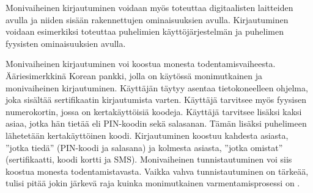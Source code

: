 Monivaiheinen kirjautuminen voidaan myös toteuttaa digitaalisten laitteiden avulla ja niiden sisään rakennettujen ominaisuuksien avulla. Kirjautuminen voidaan esimerkiksi toteuttaa puhelimien käyttöjärjestelmän ja puhelimen fyysisten ominaisuuksien avulla. 

Monivaiheinen kirjautuminen voi koostua monesta todentamisvaiheesta. Ääriesimerkkinä Korean pankki, jolla on käytössä monimutkainen ja monivaiheinen kirjautuminen. Käyttäjän täytyy asentaa tietokoneelleen ohjelma, joka sisältää sertifikaatin kirjautumista varten. Käyttäjä tarvitsee myös fyysisen numerokortin, jossa on kertakäyttöisiä koodeja. Käyttäjä tarvitsee lisäksi kaksi asiaa, jotka hän tietää eli PIN-koodin sekä salasanan. Tämän lisäksi puhelimeen lähetetään kertakäyttöinen koodi. Kirjautuminen koostuu kahdesta asiasta, ”jotka tiedä” (PIN-koodi ja salasana) ja kolmesta asiasta, ”jotka omistat” (sertifikaatti, koodi kortti ja SMS). Monivaiheinen tunnistautuminen voi siis koostua monesta todentamistavasta. Vaikka vahva tunnistautuminen on tärkeää, tulisi pitää jokin järkevä raja kuinka monimutkainen varmentamisprosessi on \citep{rittenhouse2015survey}.
